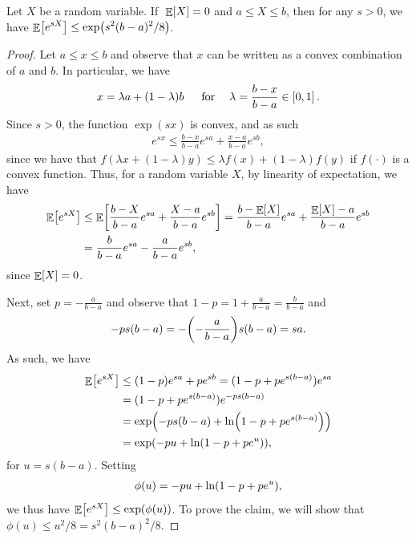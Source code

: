 \begin{lemma}
    Let $X$ be a random variable.  If $\;\mathop{\mathbb{E}}\!\left[ {X} \right]=0$ and $a\le X\le b$,
    then for any $s > 0$, we have $\displaystyle \Ex{ e^{sX} } \le
    \exp\pth{ s^{2}(b-a)^{2} / 8 }$.

\end{lemma}
\begin{proof}
    Let $a\le x \le b$ and observe that $x$ can be written as a convex
    combination of $a$ and $b$. In particular, we have
    \begin{align*}
        x = \lambda a + (1-\lambda) b \text{\;\; ~ for ~\; } \lambda =
        \frac{b-x}{b-a} \in \left[ { 0,1 } \right].
    \end{align*}
    Since $s > 0$, the function $\exp(sx)$ is convex, and as such
    \begin{align*}
        e^{sx} \le \frac{b-x}{b-a} e^{sa} + \frac{x-a}{b-a} e^{sb},
    \end{align*}
    since we have that $f(\lambda x + (1-\lambda) y) \leq \lambda f(x)
    + (1-\lambda) f(y)$ if $f(\cdot)$ is a convex function.  Thus, for
    a random variable $X$, by linearity of expectation, we have
    \begin{align*}
        \Ex{e^{sX}}
        &\le \Ex{ \frac{b-X}{b-a} e^{sa} +
           \frac{X-a}{b-a} e^{sb}}
        = \frac{b - \Ex{X}}{b-a}e^{sa} + \frac{\Ex{X} -
           a}{b-a}{e^{sb}}%
        \\%
        &=%
        \frac{b }{b-a}e^{sa} - \frac{  a}{b-a}{e^{sb}},
    \end{align*}
    since $\mathop{\mathbb{E}}\!\left[ {X} \right] = 0$.


    Next, set $\displaystyle p = - \frac{a}{b-a}$ and observe that
    $\displaystyle 1-p = 1 + \frac{a}{b-a} = \frac{b}{b-a}$ and
    \begin{align*}
    -ps(b-a) = - \pth{- \frac{ a}{b-a}} s (b-a) = sa .
    \end{align*}
    As such, we have
    \begin{align*}
        \Ex{e^{sX}}%
        &\leq  (1-p)e^{sa} + p e^{sb}
        =%
        (1-p+p e^{s(b-a)}) e^{sa} \\
        &=%
        (1-p+p e^{s(b-a)}) e^{-ps(b-a)} \\%
        &=%
        \exp \pth{ -ps(b-a) + \ln\pth{ 1-p+p e^{s(b-a)} }} \\
        &= \exp \pth{ -p u + \ln\pth{ 1-p+p e^{u} }},
    \end{align*}
    for $u = s(b-a)$. Setting
    \begin{align*}
        \phi(u) = -pu + \ln\pth{1-p+pe^{u}},
    \end{align*}
    we thus have $\Ex{e^{sX}} \leq \exp \pth{ \phi(u) }$.  To prove
    the claim, we will show that $\displaystyle \phi(u) \le {u^{2}} /
    {8} = {s^{2}(b-a)^{2}} / {8}$.


\end{proof}
